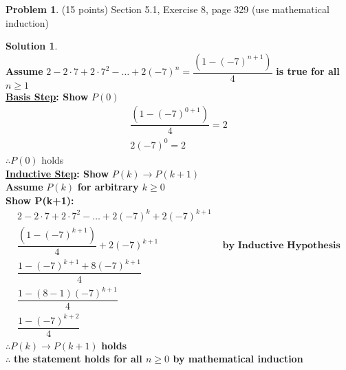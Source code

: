 \documentclass{article}
\theoremstyle{definition}
\newtheorem{problem}{Problem}
\newtheorem*{solution}{Solution}
\begin{document}
\begin{problem} (15 points)
Section 5.1, Exercise 8, page 329 (use mathematical induction)
\end{problem}
\begin{solution} \ \\
\textbf{Assume} $2-2\cdot 7+2\cdot 7^2 -\dots +2(-7)^n = \dfrac{(1-(-7)^{n+1})}{4}$ \textbf{is true for all} $n \ge 1 $ \\
\textbf{\underline{Basis Step}: Show } $P(0)$
\begin{align*}
  \dfrac{(1-(-7)^{0+1})}{4} = 2 \\
  2(-7)^0 = 2
\end{align*}
$\therefore P(0)$ holds \\
\textbf{\underline{Inductive Step}: Show } $P(k) \rightarrow P(k+1)$ \\
\textbf{Assume} $P(k)$ \textbf{for arbitrary $k \ge 0 $} \\
\textbf{Show P(k+1):} \\
\begin{align*}
  2-2\cdot 7+2\cdot 7^2 -\dots +2(-7)^k +2(-7)^{k+1} \\
  \dfrac{(1-(-7)^{k+1})}{4} + 2(-7)^{k+1}  &\textbf { by Inductive Hypothesis} \\
  \dfrac{1-(-7)^{k+1}+ 8(-7)^{k+1}}{4} \\
  \dfrac{1 - (8-1)(-7)^{k+1}}{4} \\
  \dfrac{1 - (-7)^{k+2}}{4}
\end{align*}
$\therefore P(k) \rightarrow P(k+1)$ \textbf{holds}\\
$\therefore$ \textbf{the statement holds for all $n \ge 0 $ by mathematical induction}
\end{solution}
\end{document}
